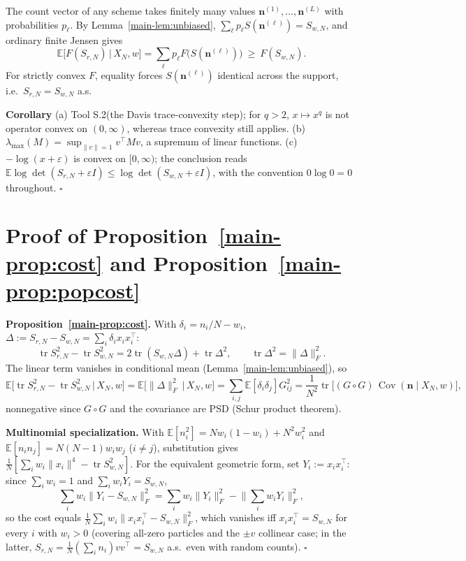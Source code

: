 The count vector of any scheme takes finitely many values $\boldsymbol n^{(1)},\dots,\boldsymbol n^{(L)}$ with probabilities $p_\ell$. By Lemma~\ref{main-lem:unbiased}, $\sum_\ell p_\ell S(\boldsymbol n^{(\ell)})=S_{w,N}$, and ordinary finite Jensen gives
\[
\mathbb E\big[F(S_{r,N})\,\big|\,X_N,w\big]=\sum_{\ell}p_\ell F\big(S(\boldsymbol n^{(\ell)})\big)\ \ge\ F(S_{w,N}).
\]
For strictly convex $F$, equality forces $S(\boldsymbol n^{(\ell)})$ identical across the support, i.e.\ $S_{r,N}=S_{w,N}$ a.s.

\textbf{Corollary} (a) Tool S.2(the Davis trace-convexity step); for $q>2$, $x\mapsto x^q$ is not operator convex on $(0,\infty)$, whereas trace convexity still applies. (b) $\lambda_{\max}(M)=\sup_{\|v\|=1}v^\top Mv$, a supremum of linear functions. (c) $-\log(x+\varepsilon)$ is convex on $[0,\infty)$; the conclusion reads $\mathbb E\log\det(S_{r,N}+\varepsilon I)\le\log\det(S_{w,N}+\varepsilon I)$, with the convention $0\log0=0$ throughout. $\square$

\section{Proof of Proposition~\ref{main-prop:cost} and Proposition~\ref{main-prop:popcost}}\label{sec:S3}

\textbf{Proposition~\ref{main-prop:cost}.} With $\delta_i=n_i/N-w_i$, $\Delta:=S_{r,N}-S_{w,N}=\sum_i\delta_ix_ix_i^\top$:
\[
\operatorname{tr}S_{r,N}^2-\operatorname{tr}S_{w,N}^2=2\operatorname{tr}(S_{w,N}\Delta)+\operatorname{tr}\Delta^2,\qquad \operatorname{tr}\Delta^2=\|\Delta\|_F^2.
\]
The linear term vanishes in conditional mean (Lemma~\ref{main-lem:unbiased}), so
\[
\mathbb E\big[\operatorname{tr}S_{r,N}^2-\operatorname{tr}S_{w,N}^2\,\big|\,X_N,w\big]=\mathbb E\big[\|\Delta\|_F^2\,\big|\,X_N,w\big]=\sum_{i,j}\mathbb E[\delta_i\delta_j]G_{ij}^2=\frac1{N^2}\operatorname{tr}\big[(G\circ G)\,\operatorname{Cov}(\boldsymbol n\mid X_N,w)\big],
\]
nonnegative since $G\circ G$ and the covariance are PSD (Schur product theorem).

\textbf{Multinomial specialization.} With $\mathbb E[n_i^2]=Nw_i(1-w_i)+N^2w_i^2$ and $\mathbb E[n_in_j]=N(N-1)w_iw_j$ ($i\neq j$), substitution gives $\frac1N[\sum_iw_i\|x_i\|^4-\operatorname{tr}S_{w,N}^2]$. For the equivalent geometric form, set $Y_i:=x_ix_i^\top$: since $\sum_iw_i=1$ and $\sum_iw_iY_i=S_{w,N}$,
\[
\sum_iw_i\big\|Y_i-S_{w,N}\big\|_F^2=\sum_iw_i\|Y_i\|_F^2-\Big\|\sum_iw_iY_i\Big\|_F^2,
\]
so the cost equals $\frac1N\sum_iw_i\|x_ix_i^\top-S_{w,N}\|_F^2$, which vanishes iff $x_ix_i^\top=S_{w,N}$ for every $i$ with $w_i>0$ (covering all-zero particles and the $\pm v$ collinear case; in the latter, $S_{r,N}=\frac1N(\sum_in_i)vv^\top=S_{w,N}$ a.s.\ even with random counts). $\square$

